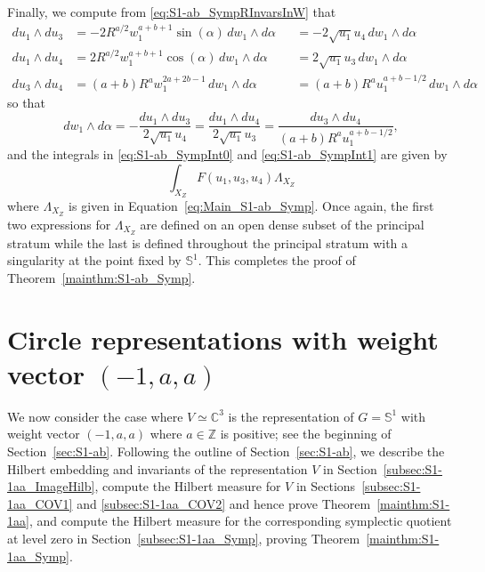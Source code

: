 \documentclass[twoside]{amsart}
\theoremstyle{definition}
\theoremstyle{remark}
\numberwithin{equation}{section}
\newcommand{\C}{\mathbb{C}}
\newcommand{\Sp}{\mathbb{S}}
\newcommand{\Z}{\mathbb{Z}}
\begin{document}
Finally, we compute from \eqref{eq:S1-ab_SympRInvarsInW} that
\begin{align*}
    du_1\wedge du_3
    &=      -2 R^{a/2} w_1^{a+b+1}\sin(\alpha) \, dw_1 \wedge d\alpha
    &&=     -2 \sqrt{u_1} u_4 \, dw_1 \wedge d\alpha
    \\
    du_1\wedge du_4
    &=      2 R^{a/2} w_1^{a+b+1}\cos(\alpha) \, dw_1 \wedge d\alpha
    &&=     2 \sqrt{u_1} u_3 \, dw_1 \wedge d\alpha
    \\
    du_3\wedge du_4
    &=      (a + b) R^a w_1^{2a + 2b - 1}  \, dw_1 \wedge d\alpha
    &&=     (a + b) R^a u_1^{a + b - 1/2}  \, dw_1 \wedge d\alpha
\end{align*}
so that
\[
    dw_1 \wedge d\alpha
    =
    -\frac{du_1\wedge du_3}{ 2 \sqrt{u_1} u_4 }
    =
    \frac{du_1\wedge du_4}{ 2 \sqrt{u_1} u_3 }
    =
    \frac{du_3\wedge du_4}{ (a + b) R^a u_1^{a + b - 1/2} },
\]
and the integrals in \eqref{eq:S1-ab_SympInt0} and \eqref{eq:S1-ab_SympInt1} are given by
\[
    \int_{X_Z} F(u_1, u_3, u_4) \Lambda_{X_Z}
\]
where $\Lambda_{X_Z}$ is given in Equation~\eqref{eq:Main_S1-ab_Symp}.
Once again, the first two expressions for $\Lambda_{X_Z}$ are defined on an open dense subset of the principal stratum while
the last is defined throughout the principal stratum with a singularity at the point fixed by $\Sp^1$.
This completes the proof of Theorem~\ref{mainthm:S1-ab_Symp}.


\section{Circle representations with weight vector $(-1, a, a)$}
\label{sec:S1-1aa}

We now consider the case where $V\simeq\C^3$ is the representation of $G = \Sp^1$ with weight vector $(-1, a, a)$ where $a\in\Z$ is positive;
see the beginning of Section~\ref{sec:S1-ab}.
Following the outline of Section~\ref{sec:S1-ab}, we describe the Hilbert embedding and invariants of the representation $V$ in
Section~\ref{subsec:S1-1aa_ImageHilb}, compute the Hilbert measure for $V$ in Sections~\ref{subsec:S1-1aa_COV1} and \ref{subsec:S1-1aa_COV2}
and hence prove Theorem~\ref{mainthm:S1-1aa}, and compute the Hilbert measure for the corresponding symplectic quotient at level zero in
Section~\ref{subsec:S1-1aa_Symp}, proving Theorem~\ref{mainthm:S1-1aa_Symp}.
\end{document}
